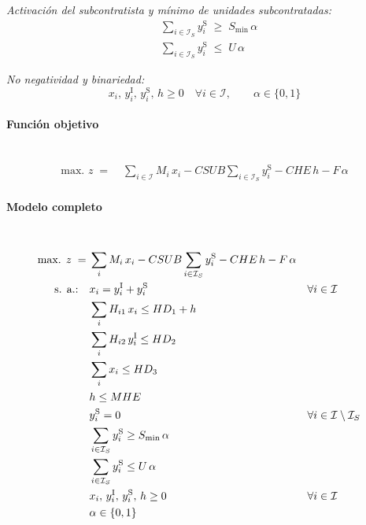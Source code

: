 \textit{Activación del subcontratista y mínimo de unidades subcontratadas:}
\begin{align}
& \sum_{i \in \mathcal{I}_S} y_i^{\mathrm{S}} \;\geq\; S_{\min}\,\alpha \\
& \sum_{i \in \mathcal{I}_S} y_i^{\mathrm{S}} \;\leq\; U\,\alpha
\end{align}

\textit{No negatividad y binariedad:}
\begin{equation}
x_i,\, y_i^{\mathrm{I}},\, y_i^{\mathrm{S}},\, h \geq 0 \quad \forall i \in \mathcal{I},
\qquad \alpha \in \{0,1\}
\end{equation}

\paragraph{Función objetivo}\mbox{}\\
\begin{align}
\mbox{max. } z \;=\;&
\sum_{i \in \mathcal{I}} M_i\,x_i
- CSUB \sum_{i \in \mathcal{I}_S} y_i^{\mathrm{S}}
- CHE\,h
- F\,\alpha
\end{align}

\paragraph{Modelo completo}\mbox{}\\[-1mm]
\begin{align}
\mbox{max. } z \;=\;&
\sum_i M_i\,x_i
- CSUB \sum_{i \in \mathcal{I}_S} y_i^{\mathrm{S}}
- CHE\,h
- F\,\alpha \notag\\
\mbox{s. a.:}\quad
& x_i = y_i^{\mathrm{I}} + y_i^{\mathrm{S}} && \forall i \in \mathcal{I} \notag\\
& \sum_i H_{i1}\,x_i \leq HD_1 + h \notag\\
& \sum_i H_{i2}\,y_i^{\mathrm{I}} \leq HD_2 \notag\\
& \sum_i x_i \leq HD_3 \notag\\
& h \leq MHE \notag\\
& y_i^{\mathrm{S}} = 0 && \forall i \in \mathcal{I}\setminus\mathcal{I}_S \notag\\
& \sum_{i \in \mathcal{I}_S} y_i^{\mathrm{S}} \geq S_{\min}\,\alpha \notag\\
& \sum_{i \in \mathcal{I}_S} y_i^{\mathrm{S}} \leq U\,\alpha \notag\\
& x_i,\, y_i^{\mathrm{I}},\, y_i^{\mathrm{S}},\, h \geq 0 && \forall i \in \mathcal{I} \notag\\
& \alpha \in \{0,1\} \notag
\end{align}



